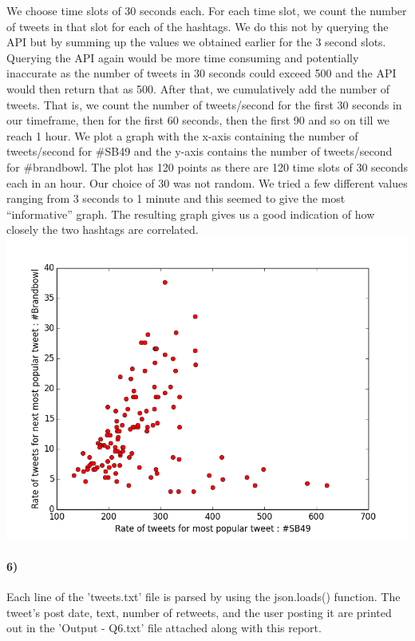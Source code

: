 \documentclass{article}
\begin{document}
We choose time slots of 30 seconds each. For each time slot, we count the number of tweets in that slot for each
of the hashtags. We do this not by querying the API but by summing up the values we obtained earlier for the 3 second slots.
Querying the API again would be more time consuming and potentially inaccurate as the number of tweets in 30 seconds
could exceed 500 and the API would then return that as 500. After that, we cumulatively add the number of tweets. That is,
we count the number of tweets/second for the first 30 seconds in our timeframe, then for the first 60 seconds, then the first 90
and so on till we reach 1 hour. We plot a graph with the x-axis containing the number of tweets/second for \#SB49
and the y-axis contains the number of tweets/second for \#brandbowl. The plot has 120 points as there are 120
time slots of 30 seconds each in an hour. Our choice of 30 was not random. We tried a few different values 
ranging from 3 seconds to 1 minute and this seemed to give the most ``informative'' graph. The resulting graph
gives us a good indication of how closely the two hashtags are correlated.\\
\includegraphics[scale=0.5]{5d}\\
\paragraph{6)}
Each line of the 'tweets.txt' file is parsed by using the json.loads() function. 
The tweet's post date, text, number of retweets, and the user posting it are printed out in the 'Output - Q6.txt' file
attached along with this report.
 
\end{document}
